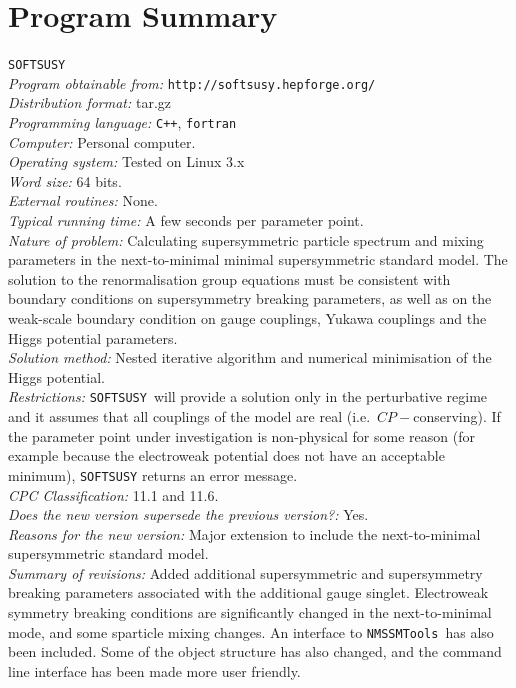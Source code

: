 \documentclass[final,3p,times]{elsarticle}
\def\SOFTSUSY{{\tt SOFTSUSY}}
\def\NMSSMTools{{\tt NMSSMTools}}
\begin{document}
\section{Program Summary}
 \SOFTSUSY{}\\
{\em Program obtainable   from:} {\tt http://softsusy.hepforge.org/}\\
{\em Distribution format:}\/ tar.gz\\
{\em Programming language:} {\tt C++}, {\tt fortran}\\
{\em Computer:}\/ Personal computer.\\
{\em Operating system:}\/ Tested on Linux 3.x\\
{\em Word size:}\/ 64 bits.\\
{\em External routines:}\/ None.\\
{\em Typical running time:}\/ A few seconds per parameter point.\\
{\em Nature of problem:}\/ Calculating supersymmetric particle spectrum and
mixing parameters in the next-to-minimal minimal supersymmetric standard
model. The solution to the renormalisation group equations must be consistent
with boundary conditions on supersymmetry breaking parameters, as
well as on the weak-scale boundary condition on gauge 
couplings, Yukawa couplings and the Higgs potential parameters.\\
{\em Solution method:}\/ Nested iterative algorithm and numerical minimisation
of the Higgs potential. \\
{\em Restrictions:} \SOFTSUSY~will provide a solution only in the
perturbative regime and it
assumes that all couplings of the model are real
(i.e.\ $CP-$conserving). If the parameter point under investigation is
non-physical for some reason (for example because the electroweak potential
does not have an acceptable minimum), \SOFTSUSY{} returns an error message.\\
{\em CPC Classification:} 11.1 and 11.6.\\
{\em Does the new version supersede the previous version?:} Yes.\\
{\em Reasons for the new version:} Major extension to include the
next-to-minimal supersymmetric standard model.\\
{\em Summary of revisions:} Added additional supersymmetric and supersymmetry
breaking parameters associated with the additional gauge singlet. Electroweak
symmetry breaking conditions are significantly changed in the next-to-minimal
mode, and some sparticle mixing changes. An interface to \NMSSMTools~has also
been included. Some of the object structure has also changed, and the command
line interface has been made more user friendly.
\end{document}
